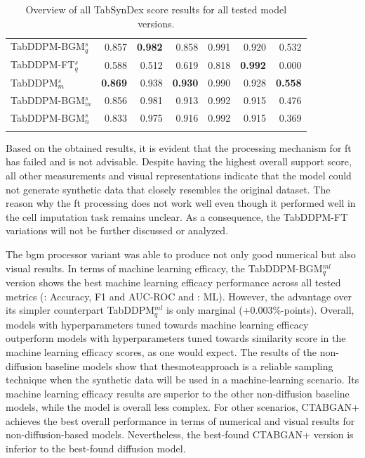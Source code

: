 \begin{table}[h]
\begin{tabular}{lrrrrrr}
		TabDDPM-BGM$^{s}_q$   & 0.857                     & \textbf{0.982} & 0.858                & 0.991          & 0.920            & 0.532          \\
		TabDDPM-FT$^{s}_q$    & 0.588                     & 0.512          & 0.619                & 0.818          & \textbf{0.992}   & 0.000          \\
		TabDDPM$^{s}_m$       & \textbf{0.869}            & 0.938          & \textbf{0.930}       & 0.990          & 0.928            & \textbf{0.558} \\
		TabDDPM-BGM$^{s}_m$   & 0.856                     & 0.981          & 0.913                & 0.992          & 0.915            & 0.476          \\
		TabDDPM-BGM$^{s}_{n}$ & 0.833                     & 0.975          & 0.916                & 0.992          & 0.915            & 0.369          \\
		\bottomrule
		\multicolumn{7}{c}{}\\[-0.6em]
	\end{tabular}
	\caption[Overview all TabSynDex results]{Overview of all TabSynDex score results for all tested model versions.}
	\label{tab:sim-all}
\end{table}


Based on the obtained results, it is evident that the processing mechanism for \gls{ft} has failed and is not advisable.
Despite having the highest overall support score, all other measurements and visual representations indicate that the model could not generate synthetic data that closely resembles the original dataset.
The reason why the \gls{ft} processing does not work well even though it performed well in the cell imputation task \cite{zheng2022DiffusionModelsMissing} remains unclear.
As a consequence, the TabDDPM-FT variations will not be further discussed or analyzed.

The \gls{bgm} processor variant was able to produce not only good numerical but also visual results.
In terms of machine learning efficacy, the TabDDPM-BGM$^{ml}_q$ version shows the best machine learning efficacy performance across all tested metrics (: Accuracy, F1 and AUC-ROC and : ML).
However, the advantage over its simpler counterpart TabDDPM$^{ml}_q$ is only marginal (+0.003\%-points).
Overall, models with hyperparameters tuned towards machine learning efficacy outperform models with hyperparameters tuned towards similarity score in the machine learning efficacy scores, as one would expect.
The results of the non-diffusion baseline models show that the\gls{smote}approach is a reliable sampling technique when the synthetic data will be used in a machine-learning scenario.
Its machine learning efficacy results are superior to the other non-diffusion baseline models, while the model is overall less complex.
For other scenarios, CTABGAN+ achieves the best overall performance in terms of numerical and visual results for non-diffusion-based models.
Nevertheless, the best-found CTABGAN+ version is inferior to the best-found diffusion model.


